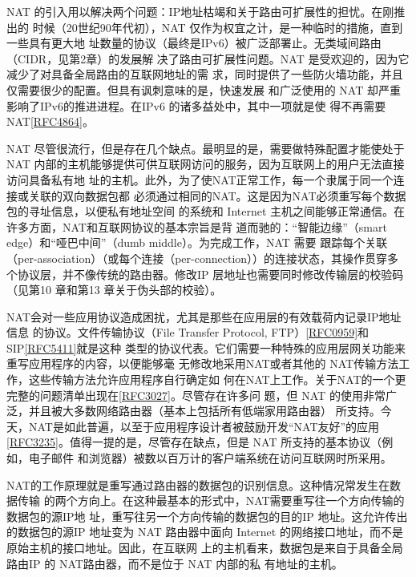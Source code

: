 NAT 的引入用以解决两个问题：IP地址枯竭和关于路由可扩展性的担忧。在刚推出的
时候（20世纪90年代初），NAT 仅作为权宜之计，是一种临时的措施，直到一些具有更大地
址数量的协议（最终是IPv6）被广泛部署止。无类域间路由（CIDR，见第2章）的发展解
决了路由可扩展性问题。NAT 是受欢迎的，因为它减少了对具备全局路由的互联网地址的需
求，同时提供了一些防火墙功能，并且仅需要很少的配置。但具有讽刺意味的是，快速发展
和广泛使用的 NAT 却严重影响了IPv6的推进进程。在IPv6 的诸多益处中，其中一项就是使
得不再需要 NAT\href{https://www.rfc-editor.org/rfc/rfc4864}{[RFC4864]}。

NAT 尽管很流行，但是存在几个缺点。最明显的是，需要做特殊配置才能使处于 NAT
内部的主机能够提供可供互联网访问的服务，因为互联网上的用户无法直接访问具备私有地
址的主机。此外，为了使NAT正常工作，每一个隶属于同一个连接或关联的双向数据包都
必须通过相同的NAT。这是因为NAT必须重写每个数据包的寻址信息，以便私有地址空间
的系统和 Internet 主机之间能够正常通信。在许多方面，NAT和互联网协议的基本宗旨是背
道而驰的：“智能边缘”（smart edge）和“哑巴中间”（dumb middle）。为完成工作，NAT 需要
跟踪每个关联（per-association）（或每个连接（per-connection））的连接状态，其操作贯穿多
个协议层，并不像传统的路由器。修改IP 层地址也需要同时修改传输层的校验码（见第10
章和第13 章关于伪头部的校验）。

NAT会对一些应用协议造成困扰，尤其是那些在应用层的有效载荷内记录IP地址信息
的协议。文件传输协议（File Transfer Protocol,
FTP）\href{https://www.rfc-editor.org/rfc/rfc0959}{[RFC0959]}和
SIP\href{https://www.rfc-editor.org/rfc/rfc5411}{[RFC5411]}就是这种
类型的协议代表。它们需要一种特殊的应用层网关功能来重写应用程序的内容，以便能够毫
无修改地采用NAT或者其他的 NAT传输方法工作，这些传输方法允许应用程序自行确定如
何在NAT上工作。关于NAT的一个更完整的问题清单出现在\href{https://www.rfc-editor.org/rfc/rfc3027}{[RFC3027]}。尽管存在许多问
题，但 NAT 的使用非常广泛，并且被大多数网络路由器（基本上包括所有低端家用路由器）
所支持。今天，NAT是如此普遍，以至于应用程序设计者被鼓励开发“NAT友好”的应用
\href{https://www.rfc-editor.org/rfc/rfc3235}{[RFC3235]}。值得一提的是，尽管存在缺点，但是
NAT 所支持的基本协议（例如，电子邮件
和浏览器）被数以百万计的客户端系统在访问互联网时所采用。

NAT的工作原理就是重写通过路由器的数据包的识别信息。这种情况常发生在数据传输
的两个方向上。在这种最基本的形式中，NAT需要重写往一个方向传输的数据包的源IP地
址，重写往另一个方向传输的数据包的目的IP 地址。这允许传出的数据包的源IP 地址变为
NAT 路由器中面向 Internet 的网络接口地址，而不是原始主机的接口地址。因此，在互联网
上的主机看来，数据包是来自于具备全局路由IP 的 NAT路由器，而不是位于 NAT 内部的私
有地址的主机。

